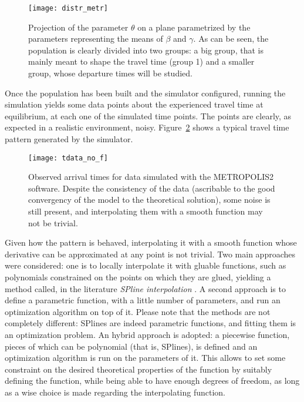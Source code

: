 \begin{figure}
  \centering
  \texttt{[image: distr\_metr]}
  \caption{Projection of the parameter \(\theta\) on a plane parametrized by the parameters representing the means of \(\beta\) and \(\gamma\).
    As can be seen, the population is clearly divided into two groups:
    a big group, that is mainly meant to shape the travel time (group 1)
  and a smaller group, whose departure times will be studied.}
  \label{fig:par_groups_sim}
\end{figure}

Once the population has been built and the simulator configured,
running the simulation yields some data points about the experienced travel time at equilibrium,
at each one of the simulated time points.
The points are clearly, as expected in a realistic environment, noisy.
Figure~\ref{fig:tdata} shows a typical travel time pattern generated by the simulator.

\begin{figure}
  \centering
  \texttt{[image: tdata\_no\_f]}
  \caption{Observed arrival times for data simulated with the METROPOLIS2 software.
    Despite the consistency of the data (ascribable to the good convergency of the model to the theoretical solution),
  some noise is still present, and interpolating them with a smooth function may not be trivial.}
  \label{fig:tdata}
\end{figure}

Given how the pattern is behaved, interpolating it with a smooth function whose derivative can be approximated at any point is not trivial.
Two main approaches were considered:
one is to locally interpolate it with gluable functions,
such as polynomials constrained on the points on which they are glued,
yielding a method called, in the literature \textit{SPline interpolation} \parencite{19671}.
A second approach is to define a parametric function, with a little number of parameters,
and run an optimization algorithm on top of it.
Please note that the methods are not completely different:
SPlines are indeed parametric functions, and fitting them is an optimization problem.
An hybrid approach is adopted:
a piecewise function, pieces of which can be polynomial (that is, SPlines),
is defined and an optimization algorithm is run on the parameters of it.
This allows to set some constraint on the desired theoretical properties of the function by suitably defining the function,
while being able to have enough degrees of freedom,
as long as a wise choice is made regarding the interpolating function.

